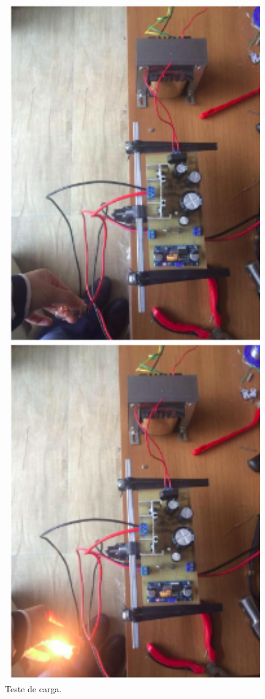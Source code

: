 \begin{figure}[!htb]
	\centering
	\includegraphics[width=14cm]{figuras/testeCarga.png}
	\caption{Teste de carga.}
	\label{testeCarga}
\end{figure}


